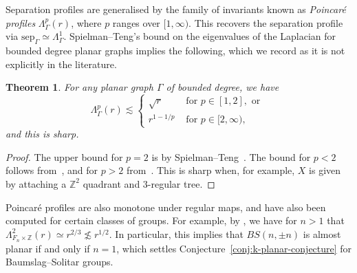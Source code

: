 \documentclass[11pt,a4paper]{amsart}
\newtheorem{theorem}{Theorem}[section]%
\newtheorem{proposition}[theorem]{Proposition}
\theoremstyle{definition}
\begin{document}
Separation profiles are generalised by the family of invariants known as \emph{Poincar\'e profiles} $\Lambda_\Gamma^p(r)$, where $p$ ranges over $ [1,\infty)$. This recovers the separation profile via $\mathrm{sep}_\Gamma \simeq \Lambda_\Gamma^1$.  Spielman--Teng's bound on the eigenvalues of the Laplacian for bounded degree planar graphs implies the following, which we record as it is not explicitly in the literature.
\begin{theorem}\label{thm:planar-poincare-profile}
	For any planar graph $\Gamma$ of bounded degree, we have
        \begin{equation*}
                \Lambda_\Gamma^p(r) \lesssim
                \begin{cases}
                        \sqrt{r} & \text{ for } p \in [1,2], \text{ or } \\
                        r^{1-1/p} & \text{ for } p \in [2,\infty),
                \end{cases}
        \end{equation*}
	and this is sharp.
\end{theorem}
\begin{proof}
	The upper bound for $p=2$ is by Spielman--Teng~\cite[Thm.~3.3]{spielman-teng-07-spectral-planar}.
	The bound for $p < 2$ follows from~\cite[Prop.~5]{hume2020poincare}, and for $p >2$ from~\cite[Corollary 2.2]{hume-mackay-25-round-trees}.
 This is sharp when, for example, $X$ is given by attaching a $\mathbb{Z}^2$ quadrant and $3$-regular tree.
\end{proof}
Poincar\'e profiles are also monotone under regular maps, and have also been computed for certain classes of groups. For example, by \cite[Thm.~1.12]{hume2022poincare}, we have for $n > 1$ that $\Lambda_{F_n\times\mathbb{Z}}^2 (r) \simeq r^{2/3} \not\lesssim r^{1/2}$. In particular, this implies that $BS(n,\pm n)$ is almost planar if and only if $n = 1$, which settles Conjecture~\ref{conj:k-planar-conjecture} for Baumslag--Solitar groups. 

\end{document}
